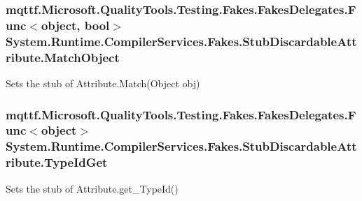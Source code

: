 \hypertarget{class_system_1_1_runtime_1_1_compiler_services_1_1_fakes_1_1_stub_discardable_attribute_ae77f2138d75f24f418c9c40b50e9ca1b}{
\subsubsection[{Match\-Object}]{\setlength{\rightskip}{0pt plus 5cm}mqttf.\-Microsoft.\-Quality\-Tools.\-Testing.\-Fakes.\-Fakes\-Delegates.\-Func$<$object, bool$>$ System.\-Runtime.\-Compiler\-Services.\-Fakes.\-Stub\-Discardable\-Attribute.\-Match\-Object}}\label{class_system_1_1_runtime_1_1_compiler_services_1_1_fakes_1_1_stub_discardable_attribute_ae77f2138d75f24f418c9c40b50e9ca1b}


Sets the stub of Attribute.\-Match(\-Object obj)

\hypertarget{class_system_1_1_runtime_1_1_compiler_services_1_1_fakes_1_1_stub_discardable_attribute_a4675f52da41febfdbae22571099a5e66}{
\subsubsection[{Type\-Id\-Get}]{\setlength{\rightskip}{0pt plus 5cm}mqttf.\-Microsoft.\-Quality\-Tools.\-Testing.\-Fakes.\-Fakes\-Delegates.\-Func$<$object$>$ System.\-Runtime.\-Compiler\-Services.\-Fakes.\-Stub\-Discardable\-Attribute.\-Type\-Id\-Get}}\label{class_system_1_1_runtime_1_1_compiler_services_1_1_fakes_1_1_stub_discardable_attribute_a4675f52da41febfdbae22571099a5e66}


Sets the stub of Attribute.\-get\-\_\-\-Type\-Id()



